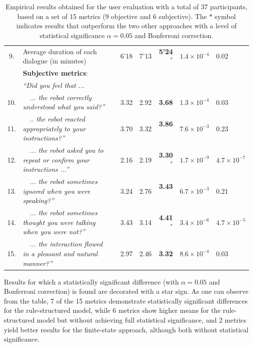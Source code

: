 \begin{table}
\begin{tabular}{|cp{110mm}c|r:r:r|p{16mm}|p{16mm}|}
9.& Average duration of each dialogue  (in minutes) \vspace{3mm} && 6'18 & 7'13 &\textbf{ 5'24}$^{\mathbf{*}}$ & $1.4\!\times\!10^{-4}$ & 0.02 \\ \hdashline
& \vspace{-2mm} \textbf{Subjective metrics}:  && & & & & \\ 
&\textit{``Did you feel that ...}  && & & & & \\ 
10.&\ \ \textit{... the robot correctly understood what you said?''}  && 3.32 & 2.92 &  \textbf{3.68} & $1.3\!\times\!10^{-4}$ & 0.03 \\
11.& \ \ \textit{.. the robot reacted appropriately to your instructions?''}   && 3.70 & 3.32 & \textbf{3.86}$^{\phantom{*}}$ & $7.6\!\times\!10^{-3}$ & 0.23 \\
12.&\ \ \textit{... the robot asked you to repeat or confirm your instructions ...''}   & & 2.16 & 2.19 & \textbf{3.30}$^{\mathbf{*}}$ & $1.7\!\times\!10^{-9}$ & $4.7\!\times\!10^{-7}$ \\
13.&\ \ \textit{... the robot sometimes ignored when you were speaking?''}  & & 3.24 & 2.76 & \textbf{3.43}$^{\phantom{*}}$ & $6.7\!\times\!10^{-3}$ & 0.21 \\
14.&\ \ \textit{... the robot sometimes thought you were talking when you were not?''}  & & 3.43 & 3.14 & \textbf{4.41}$^{\mathbf{*}}$ & $3.4\!\times\!10^{-6}$ & $4.7\!\times\!10^{-5}$ \\
15.&\ \ \textit{... the interaction flowed in a pleasant and natural manner?''} \vspace{3mm}  & & 2.97 & 2.46 & \textbf{3.32} & $8.6\!\times\!10^{-4}$ & 0.03 \\ \hline
\end{tabular} \vspace{3mm}
\label{table:results_exp3}
\caption{Empirical results obtained for the user evaluation with a total of 37 participants, based on a set of 15 metrics (9 objective and 6 subjective). The $\mathbf{*}$ symbol indicates results that outperform the two other approaches with a level of statistical significance $\alpha = 0.05$ and Bonferroni correction. }
\end{table}

Results for which a statistically significant difference (with $\alpha = 0.05$ and Bonferroni correction) is found are decorated with a star sign. As one can observe from the table, 7 of the 15 metrics demonstrate statistically significant differences for the rule-structured model, while 6 metrics show higher means for the rule-structured model but without achieving full statistical significance, and 2 metrics yield better results for the finite-state approach, although both without statistical significance. 


